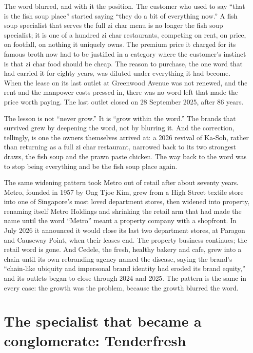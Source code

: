 \documentclass[10pt,twoside,openany]{memoir}
\newcommand{\needspacehead}{\needspace{4\baselineskip}}
\let\oldsection\section
\renewcommand{\section}{\needspacehead\oldsection}
\begin{document}
{The word blurred, and with it the position. The customer who used to say
``that is the fish soup place'' started saying ``they do a bit of
everything now.'' A fish soup specialist that serves the full zi char
menu is no longer the fish soup specialist; it is one of a hundred zi
char restaurants, competing on rent, on price, on footfall, on nothing
it uniquely owns. The premium price it charged for its famous broth now
had to be justified in a category where the customer's instinct is that
zi char food should be cheap. The reason to purchase, the one word that
had carried it for eighty years, was diluted under everything it had
become. When the lease on its last outlet at Greenwood Avenue was not
renewed, and the rent and the manpower costs pressed in, there was no
word left that made the price worth paying. The last outlet closed on 28
September 2025, after 86 years.

The lesson is not ``never grow.'' It is ``grow within the word.'' The
brands that survived grew by deepening the word, not by blurring it. And
the correction, tellingly, is one the owners themselves arrived at: a
2026 revival of Ka-Soh, rather than returning as a full zi char
restaurant, narrowed back to its two strongest draws, the fish soup and
the prawn paste chicken. The way back to the word was to stop being
everything and be the fish soup place again.

The same widening pattern took Metro out of retail after about seventy
years. Metro, founded in 1957 by Ong Tjoe Kim, grew from a High Street
textile store into one of Singapore's most loved department stores, then
widened into property, renaming itself Metro Holdings and shrinking the
retail arm that had made the name until the word ``Metro'' meant a
property company with a shopfront. In July 2026 it announced it would
close its last two department stores, at Paragon and Causeway Point,
when their leases end. The property business continues; the retail word
is gone. And Cedele, the fresh, healthy bakery and cafe, grew into a
chain until its own rebranding agency named the disease, saying the
brand's ``chain-like ubiquity and impersonal brand identity had eroded
its brand equity,'' and its outlets began to close through 2024 and
2025. The pattern is the same in every case: the growth was the problem,
because the growth blurred the word.

\section{The specialist that became a conglomerate:
Tenderfresh}\label{the-specialist-that-became-a-conglomerate-tenderfresh}

}
\end{document}
